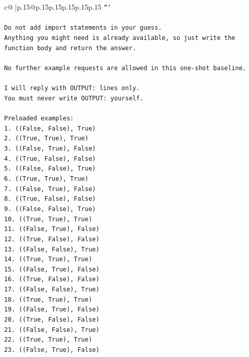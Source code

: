 \documentclass{article}
\begin{document}
{\begin{supertabular}{c@{$\;$}|p{.15\linewidth}@{}p{.15\linewidth}p{.15\linewidth}p{.15\linewidth}p{.15\linewidth}p{.15\linewidth}}
{{{\texttt{```} \\
\\ 
\texttt{Do not add import statements in your guess.} \\
\texttt{Anything you might need is already available, so just write the function body and return the answer.} \\
\\ 
\texttt{No further example requests are allowed in this one{-}shot baseline.} \\
\\ 
\texttt{I will reply with OUTPUT: lines only.} \\
\texttt{You must never write OUTPUT: yourself.} \\
\\ 
\texttt{Preloaded examples:} \\
\texttt{1. ((False, False), True)} \\
\texttt{2. ((True, True), True)} \\
\texttt{3. ((False, True), False)} \\
\texttt{4. ((True, False), False)} \\
\texttt{5. ((False, False), True)} \\
\texttt{6. ((True, True), True)} \\
\texttt{7. ((False, True), False)} \\
\texttt{8. ((True, False), False)} \\
\texttt{9. ((False, False), True)} \\
\texttt{10. ((True, True), True)} \\
\texttt{11. ((False, True), False)} \\
\texttt{12. ((True, False), False)} \\
\texttt{13. ((False, False), True)} \\
\texttt{14. ((True, True), True)} \\
\texttt{15. ((False, True), False)} \\
\texttt{16. ((True, False), False)} \\
\texttt{17. ((False, False), True)} \\
\texttt{18. ((True, True), True)} \\
\texttt{19. ((False, True), False)} \\
\texttt{20. ((True, False), False)} \\
\texttt{21. ((False, False), True)} \\
\texttt{22. ((True, True), True)} \\
\texttt{23. ((False, True), False)} \\
}}}
\end{supertabular}}
\end{document}
